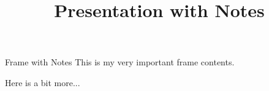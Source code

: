 \documentclass{beamer}
\title{Presentation with Notes}
\begin{document}
\begin{frame}{Frame with Notes}
	This is my very important frame contents.
	
	Here is a bit more...
\end{frame}
\end{document}
